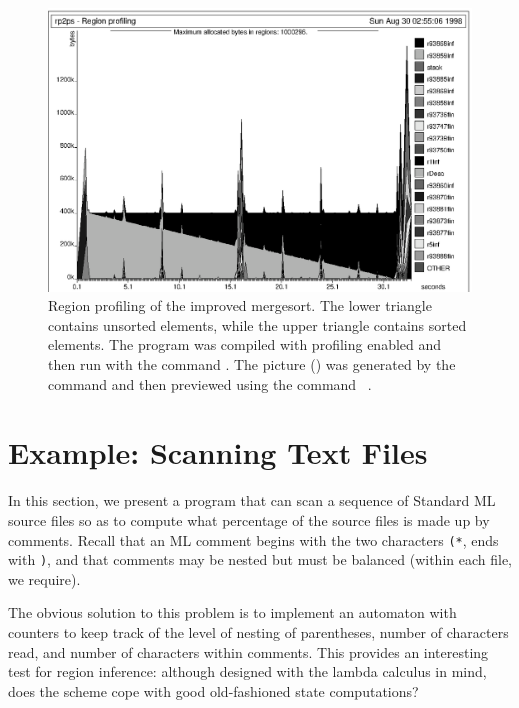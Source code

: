 \documentclass[12pt]{book}
\begin{document}
\begin{figure}
\begin{center}
\includegraphics{msortreset2.ps}
\end{center}
\caption{Region profiling of the improved mergesort. 
The lower triangle contains unsorted elements, while the
upper triangle contains sorted elements.
The program was compiled with
profiling enabled and then run with the command
. The picture () 
was generated by the command 
and then previewed using the command ~.}
\label{msortreset.fig}
\end{figure}

\section{Example: Scanning Text Files}
In this section, we present a program that can 
scan a sequence of Standard ML source
files so as to compute what percentage of the source files is made
up by comments. Recall that an ML comment begins with the two
characters {\tt (*}, ends with {\tt *)}, and that comments may be
nested but must be balanced (within each file, we require).

The obvious solution to this problem is to implement an
automaton with counters to keep track of the level
of nesting of parentheses, number of characters read, and
number of characters within comments. This provides an interesting test
for region inference: although designed with the lambda calculus
in mind, does the scheme cope with good old-fashioned state
computations? 
\end{document}
